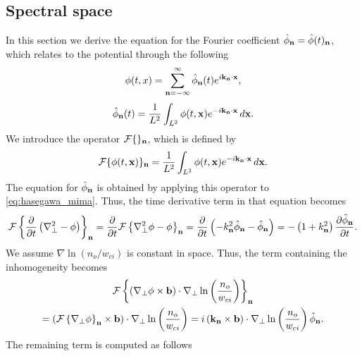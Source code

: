 \documentclass[11pt]{article}
\begin{document}
\subsection{Spectral space}
In this section we derive the equation for the Fourier coefficient $\hat{\phi}_{\mathbf{n}} = \hat{\phi}(t)_{\mathbf{n}}$, which relates to the potential through the following
\begin{equation}
    \phi(t,x) = \sum_{\mathbf{n}=-\infty}^\infty \hat{\phi}_{\mathbf{n}}(t) e^{i \mathbf{k}_{\mathbf{n}} \cdot \mathbf{x}},
\end{equation}
\begin{equation}
    \hat{\phi}_{\mathbf{n}}(t)= \frac{1}{L^2} \int_{L^2} \phi(t, \mathbf{x}) e^{-i \mathbf{k}_{\mathbf{n}} \cdot \mathbf{x}} \, d\mathbf{x} .
\end{equation}
We introduce the operator $\mathcal{F} \{ \}_{\mathbf{n}}$, which is defined by
\begin{equation}
    \mathcal{F} \{ \phi(t,\mathbf{x}) \}_{\mathbf{n}} = \frac{1}{L^2} \int_{L^2} \phi(t, \mathbf{x}) e^{-i \mathbf{k}_{\mathbf{n}} \cdot \mathbf{x}} \, d\mathbf{x} .
\end{equation}
The equation for $\hat{\phi}_{\mathbf{n}}$ is obtained by applying this operator to \cref{eq:hasegawa_mima}. Thus, the time derivative term in that equation becomes 
\begin{equation}
    \mathcal{F} \left \{ \frac{\partial}{\partial t} \left ( \nabla_\perp^2 - \phi \right ) \right \}_{\mathbf{n}} = \frac{\partial}{\partial t} \mathcal{F} \left \{ \nabla_\perp^2 \phi - \phi \right \}_{\mathbf{n}} = \frac{\partial}{\partial t} \left ( -k_{\mathbf{n}}^2 \hat{\phi}_{\mathbf{n}} - \hat{\phi}_{\mathbf{n}} \right ) = - \left ( 1 + k^2_{\mathbf{n}} \right ) \frac{\partial \hat{\phi}_{\mathbf{n}}}{\partial t}.
\end{equation}
We assume $\nabla \ln (n_o / w_{ci})$ is constant in space. Thus, the term containing the inhomogeneity becomes 
\begin{multline}
    \mathcal{F} \left \{ \left ( \nabla_\perp \phi \times \mathbf{b} \right ) \cdot \nabla_\perp \ln \left ( \frac{n_o}{w_{ci}} \right ) \right \}_{\mathbf{n}} \\
    = \left ( \mathcal{F} \left \{ \nabla_\perp \phi \right \}_{\mathbf{n}} \times \mathbf{b} \right ) \cdot \nabla_\perp \ln \left ( \frac{n_o}{w_{ci}} \right ) = i \left ( \mathbf{k}_{\mathbf{n}} \times \mathbf{b} \right ) \cdot \nabla_\perp \ln \left ( \frac{n_o}{w_{ci}} \right ) \hat{\phi}_{\mathbf{n}}.
\end{multline}
The remaining term is computed as follows
\end{document}
